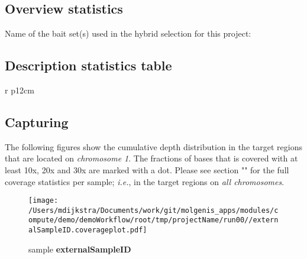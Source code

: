 \documentclass[a4paper,12pt]{article}
\begin{document}
\subsection*{Overview statistics}
\label{subsect:overviewstatistics}


\begin{minipage}{\textwidth}
	Name of the bait set(s) used in the hybrid selection for this project:\\
	\textbf{}
\end{minipage}

\clearpage
\subsection*{Description statistics table}
\begin{table}[h!]
	\centering
	\begin{tabular}{r p{12cm}}
		
	\end{tabular}
\end{table}

\clearpage
\subsection*{Capturing}
The following figures show the cumulative depth distribution in the target regions that are located on \emph{chromosome 1}. The fractions of bases that is covered with at least 10x, 20x and 30x are marked with a dot. Please see section "" for the full coverage statistics per sample; \emph{i.e.}, in the target regions on \emph{all chromosomes}.
\begin{figure}[ht]\begin{minipage}{0.5\linewidth}\caption{sample \textbf{externalSampleID}}\centering\texttt{[image: /Users/mdijkstra/Documents/work/git/molgenis\_apps/modules/compute/demo/demoWorkflow/root/tmp/projectName/run00//externalSampleID.coverageplot.pdf]}\end{minipage}\hspace{1cm}\end{figure}
\end{document}
